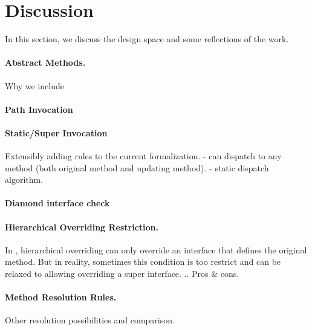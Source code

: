 \section{Discussion}
In this section, we discuss the design space and some reflections of the work. 
\paragraph{Abstract Methods.}
Why we include 
\paragraph{Path Invocation}

\paragraph{Static/Super Invocation}
Extensibly adding rules to the current formalization.
- can dispatch to any method (both original method and updating method).
- static dispatch algorithm.

\paragraph{Diamond interface check}

\paragraph{Hierarchical Overriding Restriction.}
In \MIM{}, hierarchical overriding can only override an interface that defines the original method. But in reality, sometimes this condition is too restrict and can be relaxed to allowing overriding a super interface. .. Pros & cons.

\paragraph{Method Resolution Rules.}
Other resolution possibilities and comparison.